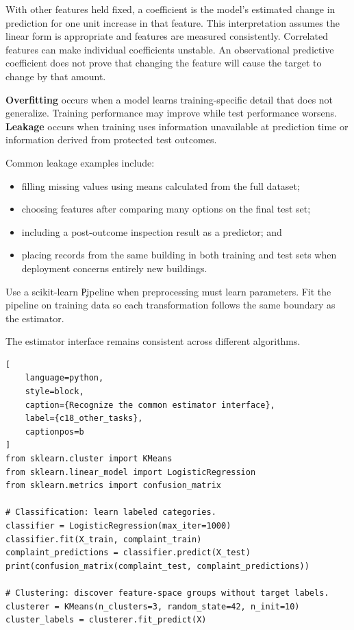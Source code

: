 
With other features held fixed, a coefficient is the model's estimated change
in prediction for one unit increase in that feature. This interpretation assumes
the linear form is appropriate and features are measured consistently. Correlated
features can make individual coefficients unstable. An observational predictive
coefficient does not prove that changing the feature will cause the target to
change by that amount.


\textbf{Overfitting} occurs when a model learns training-specific detail that
does not generalize. Training performance may improve while test performance
worsens. \textbf{Leakage} occurs when training uses information unavailable at
prediction time or information derived from protected test outcomes.

Common leakage examples include:

\begin{itemize}
    \item filling missing values using means calculated from the full dataset;
    \item choosing features after comparing many options on the final test set;
    \item including a post-outcome inspection result as a predictor; and
    \item placing records from the same building in both training and test sets
          when deployment concerns entirely new buildings.
\end{itemize}

Use a scikit-learn \c{Pipeline} when preprocessing must learn parameters. Fit
the pipeline on training data so each transformation follows the same boundary
as the estimator.


The estimator interface remains consistent across different algorithms.

\begin{lstlisting}[
    language=python,
    style=block,
    caption={Recognize the common estimator interface},
    label={c18_other_tasks},
    captionpos=b
]
from sklearn.cluster import KMeans
from sklearn.linear_model import LogisticRegression
from sklearn.metrics import confusion_matrix

# Classification: learn labeled categories.
classifier = LogisticRegression(max_iter=1000)
classifier.fit(X_train, complaint_train)
complaint_predictions = classifier.predict(X_test)
print(confusion_matrix(complaint_test, complaint_predictions))

# Clustering: discover feature-space groups without target labels.
clusterer = KMeans(n_clusters=3, random_state=42, n_init=10)
cluster_labels = clusterer.fit_predict(X)
\end{lstlisting}

